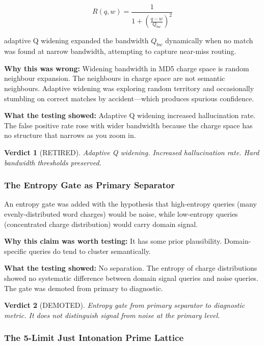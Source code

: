 \documentclass[11pt]{article}
\newtheorem{verdict}{Verdict}
\begin{document}
\begin{equation}
  R(q, w) = \frac{1}{1 + \left(\frac{q - w}{Q_{bw}}\right)^2}
\end{equation}

adaptive Q widening expanded the bandwidth $Q_{bw}$ dynamically when no match was found at narrow bandwidth, attempting to capture near-miss routing.

\textbf{Why this was wrong:} Widening bandwidth in MD5 charge space is random neighbour expansion. The neighbours in charge space are not semantic neighbours. Adaptive widening was exploring random territory and occasionally stumbling on correct matches by accident---which produces spurious confidence.

\textbf{What the testing showed:} Adaptive Q widening increased hallucination rate. The false positive rate rose with wider bandwidth because the charge space has no structure that narrows as you zoom in.

\begin{verdict}[\textcolor{warnyellow}{RETIRED}]
Adaptive Q widening. Increased hallucination rate. Hard bandwidth thresholds preserved.
\end{verdict}

\subsubsection{The Entropy Gate as Primary Separator}

An entropy gate was added with the hypothesis that high-entropy queries (many evenly-distributed word charges) would be noise, while low-entropy queries (concentrated charge distribution) would carry domain signal.

\textbf{Why this claim was worth testing:} It has some prior plausibility. Domain-specific queries do tend to cluster semantically.

\textbf{What the testing showed:} No separation. The entropy of charge distributions showed no systematic difference between domain signal queries and noise queries. The gate was demoted from primary to diagnostic.

\begin{verdict}[\textcolor{warnyellow}{DEMOTED}]
Entropy gate from primary separator to diagnostic metric. It does not distinguish signal from noise at the primary level.
\end{verdict}

\subsubsection{The 5-Limit Just Intonation Prime Lattice}
\end{document}
